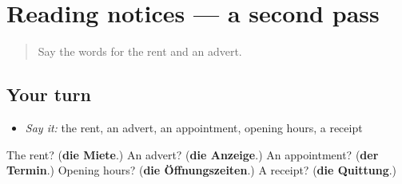\section[(dialogue)]{Reading notices — a second pass}

\label{lesson:GE-R143-second-pass-reading-notices}



\begin{quote}
Say the words for the rent and an advert.
\end{quote}

\subsection*{Your turn}
\begin{itemize}
\raggedright
  \item \emph{Say it:} the rent, an advert, an appointment, opening hours, a receipt
\end{itemize}

\begin{tcolorbox}[breakable,colback=teal!4,colframe=teal!35!black,title={Before you move on}]
The rent? (\textbf{die Miete}.) An advert? (\textbf{die Anzeige}.) An appointment? (\textbf{der Termin}.) Opening hours? (\textbf{die Öffnungszeiten}.) A receipt? (\textbf{die Quittung}.)
\end{tcolorbox}
